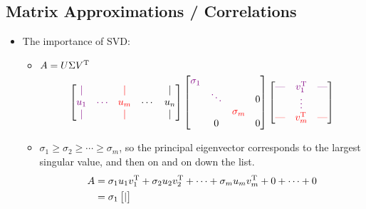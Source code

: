\documentclass{article}
\begin{document}
\subsection*{Matrix Approximations / Correlations}
\begin{itemize}
    \item {}The importance of SVD:
    \begin{itemize}
        \item $A=U\Sigma V^{\text{T}}$
        \begin{equation*}
            \begin{bmatrix}
                {\color{red!50!blue}|} & & {\color{red}|} & & |\\
                {\color{red!50!blue}u_1} & {\color{red!50!blue}\cdots} & {\color{red}u_m} & \cdots & u_n\\
                {\color{red!50!blue}|} & & {\color{red}|} & & |\\
            \end{bmatrix}
            \begin{bmatrix}
                {\color{red!50!blue}\sigma_1} & & &\\
                & {\color{red!50!blue}\ddots} & & 0\\
                & & {\color{red}\sigma_m} &\\
                & 0 & & 0\\ 
            \end{bmatrix}
            \begin{bmatrix}
                {\color{red!50!blue}\text{---}} & {\color{red!50!blue}v_1^\T} & {\color{red!50!blue}\text{---}}\\
                & {\color{red!50!blue}\vdots} & \\
                {\color{red}\text{---}} & {\color{red}v_m^\T} & {\color{red}\text{---}}\\
            \end{bmatrix}
        \end{equation*}
        \item $\sigma_1\geq\sigma_2\geq\cdots\geq\sigma_m$, so the principal eigenvector corresponds to the largest singular value, and then on and on down the list.
        \begin{align*}
            A &= \sigma_1u_1v_1^{\text{T}}+\sigma_2u_2v_2^{\text{T}}+\cdots+\sigma_mu_mv_m^{\text{T}}+0+\cdots+0\\
            &= \sigma_1
            \begin{bmatrix}
                |\\

\end{bmatrix}
\end{align*}
\end{itemize}
\end{itemize}
\end{document}

